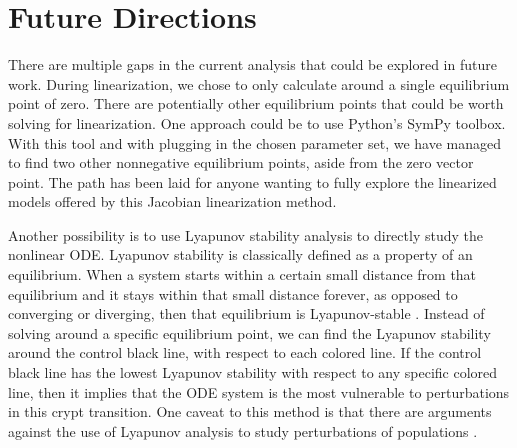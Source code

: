 \section{Future Directions}

There are multiple gaps in the current analysis that could be explored in future work. During linearization, we chose to only calculate around a single equilibrium point of zero. There are potentially other equilibrium points that could be worth solving for linearization. One approach could be to use Python’s SymPy toolbox. With this tool and with plugging in the chosen parameter set, we have managed to find two other nonnegative equilibrium points, aside from the zero vector point. The path has been laid for anyone wanting to fully explore the linearized models offered by this Jacobian linearization method. 

Another possibility is to use Lyapunov stability analysis to directly study the nonlinear ODE. Lyapunov stability is classically defined as a property of an equilibrium. When a system starts within a certain small distance from that equilibrium and it stays within that small distance forever, as opposed to converging or diverging, then that equilibrium is Lyapunov-stable \autocite{StabilityAndLyapunovStabilityOfDynamicalSystems}. Instead of solving around a specific equilibrium point, we can find the Lyapunov stability around the control black line, with respect to each colored line. If the control black line has the lowest Lyapunov stability with respect to any specific colored line, then it implies that the ODE system is the most vulnerable to perturbations in this crypt transition. One caveat to this method is that there are arguments against the use of Lyapunov analysis to study perturbations of populations \autocite{Justus_2008}.